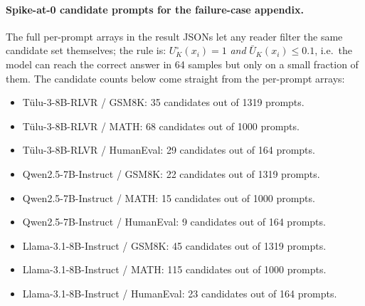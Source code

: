 \paragraph{Spike-at-0 candidate prompts for the failure-case appendix.} The full per-prompt arrays in the result JSONs let any reader filter the same candidate set themselves; the rule is:
$U^\circ_K(x_i)=1$ \emph{and} $\bar U_K(x_i) \le 0.1$, i.e.\ the model can reach the correct answer in 64 samples but only on a small fraction of them. The candidate counts below come straight from the per-prompt arrays:
\begin{itemize}
  \item Tülu-3-8B-RLVR / GSM8K: 35 candidates out of 1319 prompts.
  \item Tülu-3-8B-RLVR / MATH: 68 candidates out of 1000 prompts.
  \item Tülu-3-8B-RLVR / HumanEval: 29 candidates out of 164 prompts.
  \item Qwen2.5-7B-Instruct / GSM8K: 22 candidates out of 1319 prompts.
  \item Qwen2.5-7B-Instruct / MATH: 15 candidates out of 1000 prompts.
  \item Qwen2.5-7B-Instruct / HumanEval: 9 candidates out of 164 prompts.
  \item Llama-3.1-8B-Instruct / GSM8K: 45 candidates out of 1319 prompts.
  \item Llama-3.1-8B-Instruct / MATH: 115 candidates out of 1000 prompts.
  \item Llama-3.1-8B-Instruct / HumanEval: 23 candidates out of 164 prompts.
\end{itemize}